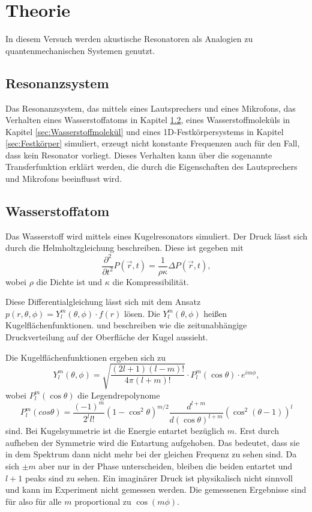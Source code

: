 \section{Theorie}
\label{sec:Theorie}

In diesem Versuch werden akustische Resonatoren als Analogien zu quantenmechanischen Systemen genutzt. 

\subsection{Resonanzsystem}

Das Resonanzsystem, das mittels eines Lautsprechers und eines Mikrofons, das Verhalten eines Wasserstoffatoms in Kapitel \ref{sec:Wasserstoff}, eines Wasserstoffmoleküls in Kapitel \ref{sec:Wasserstoffmolekül} und eines 1D-Festkörpersystems in Kapitel \ref{sec:Festkörper} simuliert, erzeugt nicht konstante Frequenzen auch für den Fall, dass kein Resonator vorliegt.
Dieses Verhalten kann über die sogenannte Transferfunktion erklärt werden, die durch die Eigenschaften des Lautsprechers und Mikrofons beeinflusst wird. 


\subsection{Wasserstoffatom}
\label{sec:Wasserstoff}
Das Wasserstoff wird mittels eines Kugelresonators simuliert. Der Druck lässt sich durch die Helmholtzgleichung beschreiben. 
Diese ist gegeben mit 
\begin{equation*}
    \frac{\partial^2}{\partial t^2} P(\vec r,t) = \frac{1}{\rho\kappa} \Delta P(\vec r,t),
\end{equation*}
wobei $\rho$ die Dichte ist und $\kappa$ die Kompressibilität. 

Diese Differentialgleichung lässt sich mit dem Ansatz $p(r, \theta, \phi) = Y^m_l(\theta, \phi) \cdot f(r)$ lösen.
Die $Y^m_l(\theta, \phi)$ heißen Kugelflächenfunktionen. und beschreiben wie die zeitunabhängige Druckverteilung auf der Oberfläche der Kugel aussieht. 

Die Kugelflächenfunktionen ergeben sich zu 
\begin{equation*}
    Y^m_l (\theta, \phi) = \sqrt{\frac{(2l+1)(l-m)!}{4\pi(l+m)!}} \cdot P^m_l(\cos \theta) \cdot e^{i m \phi},
\end{equation*}
wobei $P^m_l(\cos \theta)$ die Legendrepolynome 
\begin{equation*}
P^m_l(cos \theta) = \frac{(-1)^m}{2^l l!} (1- \cos^2 \theta)^{m/2} \frac{d^{l+m}}{d(\cos \theta)^{l+m}} (\cos^2 (\theta -1))^l
\end{equation*}
sind.
Bei Kugelsymmetrie ist die Energie entartet bezüglich $m$. 
Erst durch aufheben der Symmetrie wird die Entartung aufgehoben.  
Das bedeutet, dass sie in dem Spektrum dann nicht mehr bei der gleichen Frequenz zu sehen sind. Da sich $\pm m$ aber nur in der Phase unterscheiden, bleiben die beiden entartet und $l+1$ peaks sind zu sehen. 
Ein imaginärer Druck ist physikalisch nicht sinnvoll und kann im Experiment nicht gemessen werden. Die gemessenen Ergebnisse sind für also für alle $m$ proportional zu $\cos(m\phi)$. 

